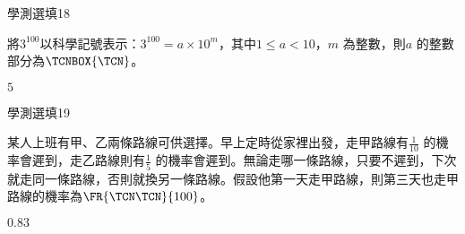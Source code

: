 \begin{QUESTIONS}
\begin{QUESTION}
        \begin{QEMPTYSPACE}
        \end{QEMPTYSPACE}
    \end{QUESTION}
    \begin{QUESTION}
        \begin{ExamInfo}{86}{學測}{選填}{18}
        \end{ExamInfo}
        \begin{ExamAnsRateInfo}{}{}{}{}
        \end{ExamAnsRateInfo}
        \begin{QBODY}
            將${{3}^{100}}$以科學記號表示：${{3}^{100}}=a\times {{10}^{m}}$，其中$1\le a<10$，$m$ 為整數，則$a$ 的整數部分為$\TCNBOX{\TCN}$。
        \end{QBODY}
        \begin{QFROMS}
        \end{QFROMS}
        \begin{QTAGS}\end{QTAGS}
        \begin{QANS}
            $5$
        \end{QANS}
        \begin{QSOLLIST}
        \end{QSOLLIST}
        \begin{QEMPTYSPACE}
        \end{QEMPTYSPACE}
    \end{QUESTION}
    \begin{QUESTION}
        \begin{ExamInfo}{86}{學測}{選填}{19}
        \end{ExamInfo}
        \begin{ExamAnsRateInfo}{}{}{}{}
        \end{ExamAnsRateInfo}
        \begin{QBODY}
            某人上班有甲、乙兩條路線可供選擇。早上定時從家裡出發，走甲路線有$\frac{1}{10}$ 的機率會遲到，走乙路線則有$\frac{1}{5}$ 的機率會遲到。無論走哪一條路線，只要不遲到，下次就走同一條路線，否則就換另一條路線。假設他第一天走甲路線，則第三天也走甲路線的機率為$\FR{\TCN\TCN}{100}$。
        \end{QBODY}
        \begin{QFROMS}
        \end{QFROMS}
        \begin{QTAGS}\end{QTAGS}
        \begin{QANS}
            $0.83$
        \end{QANS}

\end{QUESTION}
\end{QUESTIONS}
